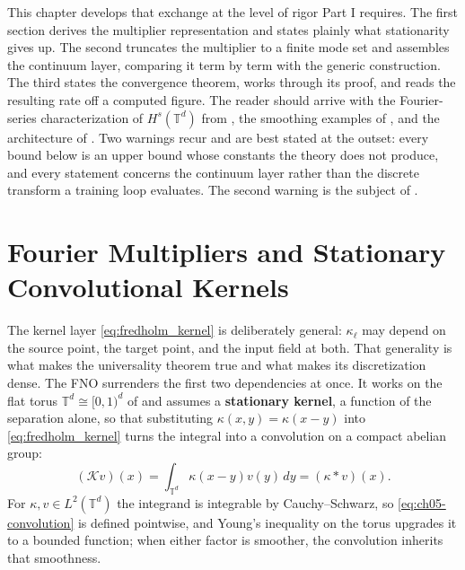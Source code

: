 This chapter develops that exchange at the level of rigor Part I requires. The
first section derives the multiplier representation and states plainly what
stationarity gives up. The second truncates the multiplier to a finite mode set
and assembles the continuum layer, comparing it term by term with the generic
construction. The third states the convergence theorem, works through its
proof, and reads the resulting rate off a computed figure. The reader should
arrive with the Fourier-series characterization of $H^s(\mathbb{T}^d)$ from
, the smoothing
examples of , and
the architecture of .
Two warnings recur and are best stated at the outset: every bound below is an
upper bound whose constants the theory does not produce, and every statement
concerns the continuum layer rather than the discrete transform a training loop
evaluates. The second warning is the subject of
.

\section{Fourier Multipliers and Stationary Convolutional Kernels}
\label{sec:ch05-multipliers}

The kernel layer \eqref{eq:fredholm_kernel} is deliberately general:
$\kappa_\ell$ may depend on the source point, the target point, and the input
field at both. That generality is what makes the universality theorem true and
what makes its discretization dense. The FNO surrenders the first two
dependencies at once. It works on the flat torus
$\mathbb{T}^d \cong [0,1)^d$ of
 and assumes a
\textbf{stationary kernel}, a function of the separation alone, so that
substituting $\kappa(x,y) = \kappa(x-y)$ into \eqref{eq:fredholm_kernel} turns
the integral into a convolution on a compact abelian group:
\begin{equation}
  \label{eq:ch05-convolution}
  (\mathcal{K} v)(x) = \int_{\mathbb{T}^d} \kappa(x - y) v(y) \, dy = (\kappa * v)(x).
\end{equation}
For $\kappa, v \in L^2(\mathbb{T}^d)$ the integrand is integrable by
Cauchy--Schwarz, so \eqref{eq:ch05-convolution} is defined pointwise, and
Young's inequality on the torus upgrades it to a bounded function; when either
factor is smoother, the convolution inherits that smoothness.

